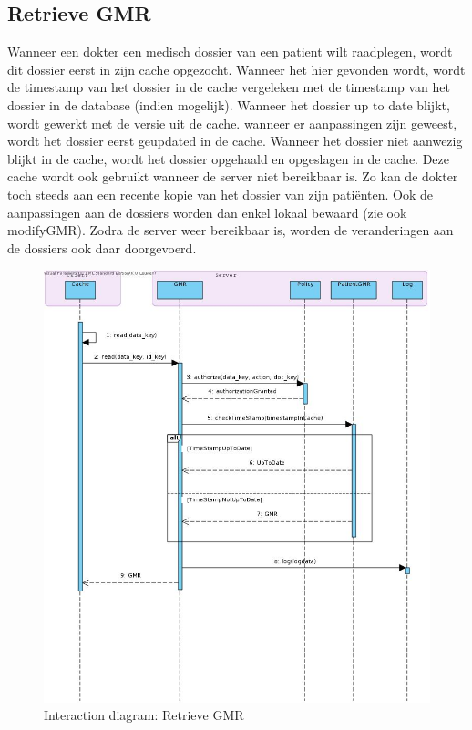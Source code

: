 \documentclass[a4paper,10pt]{article}
\begin{document}
\subsection{Retrieve GMR}
Wanneer een dokter een medisch dossier van een patient wilt raadplegen, wordt dit dossier eerst in zijn cache opgezocht. Wanneer het hier gevonden wordt, wordt de timestamp van het dossier in de cache vergeleken met de timestamp van het dossier in de database (indien mogelijk). Wanneer het dossier up to date blijkt, wordt gewerkt met de versie uit de cache. wanneer er aanpassingen zijn geweest, wordt het dossier eerst geupdated in de cache. Wanneer het dossier niet aanwezig blijkt in de cache, wordt het dossier opgehaald en opgeslagen in de cache. 
Deze cache wordt ook gebruikt wanneer de server niet bereikbaar is. Zo kan de dokter toch steeds aan een recente kopie van het dossier van zijn patiënten. Ook de aanpassingen aan de dossiers worden dan enkel lokaal bewaard (zie ook modifyGMR). Zodra de server weer bereikbaar is, worden de veranderingen aan de dossiers ook daar doorgevoerd. 

\begin{figure}[!h]
  \includegraphics[width=\textwidth]{../images/retrieveGMR.jpg}
  \caption{Interaction diagram: Retrieve GMR}
\end{figure}
\end{document}
